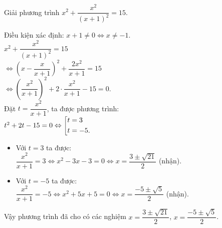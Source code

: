 \begin{bt}%
	Giải phương trình $x^2 + \dfrac{x^2}{(x+1)^2} = 15$.
	\loigiai
	{
		Điều kiện xác định: $x + 1 \neq 0 \Leftrightarrow x \neq -1$.\\
		\hspace*{0.6cm} $x^2 + \dfrac{x^2}{(x+1)^2} = 15$\\
		$\Leftrightarrow \left(x - \dfrac{x}{x+1}\right)^2 + \dfrac{2x^2}{x+1} = 15$\\
		$\Leftrightarrow \left( \dfrac{x^2}{x+1} \right)^2 + 2 \cdot \dfrac{x^2}{x+1} - 15 = 0$.\\
		Đặt $t = \dfrac{x^2}{x+1}$, ta được phương trình:\\
		\hspace*{0.6cm}$t^2 + 2t - 15 = 0 \Leftrightarrow \left[\begin{aligned}& t = 3 \\& t = -5.\end{aligned}\right.$
		\begin{itemize}
			\item Với $t = 3$ ta được:\\
			$\dfrac{x^2}{x+1} = 3 \Leftrightarrow x^2 - 3x - 3 = 0 \Leftrightarrow x = \dfrac{3 \pm \sqrt{21}}{2}$ (nhận).
			\item Với $t = -5$ ta được:\\
			$\dfrac{x^2}{x+1} = -5 \Leftrightarrow x^2 + 5x + 5 = 0 \Leftrightarrow x = \dfrac{-5 \pm \sqrt{5}}{2}$ (nhận).
		\end{itemize}
		Vậy phương trình đã cho có các nghiệm $x = \dfrac{3 \pm \sqrt{21}}{2}$, $x = \dfrac{-5 \pm \sqrt{5}}{2}$.
	}	
\end{bt}


